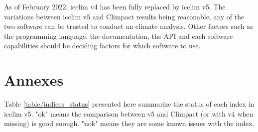 \documentclass[a4paper,11pt]{article}
\begin{document}
    As of February 2022, icclim v4 has been fully replaced by icclim v5.
    The variations between icclim v5 and Climpact results being reasonable, any of the two software can be trusted to conduct an climate analysis.
    Other factors such as the programming language, the documentation, the API and each software capabilities should be deciding factors for which software to use. 


\part{Annexes}

    Table \ref{table/indices_status} presented here summarize the status of each index in icclim v5.
    "ok" means the comparison between v5 and Climpact (or with v4 when missing) is good enough.
    "nok" means they are some known issues with the index.
\end{document}
